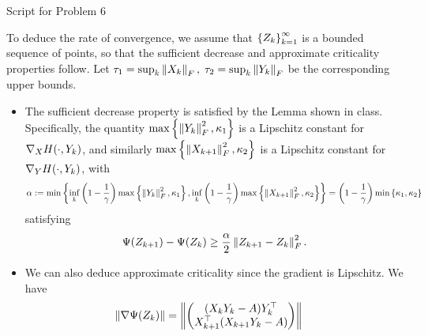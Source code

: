 \documentclass[10pt]{article}
\begin{document}
\begin{longlisting} \label{p6code}
	\inputminted{python}{hw2_p6.py}
	\caption{Script for Problem 6}
\end{longlisting}

To deduce the rate of convergence, we assume that $\left\{ Z_k \right\}_{k=1}^{\infty}$ is
a bounded sequence of points, so that the sufficient decrease and approximate
criticality properties follow. Let $\tau_1 = \sup_{k} \left \| X_k \right \|_F, \;
\tau_2 = \sup_{k} \left \| Y_k \right \|_F$ be the corresponding upper bounds.
\begin{itemize}
\item The sufficient decrease property is satisfied by the Lemma shown in class.
Specifically, the quantity $\max\left\{ \left \| Y_k \right \|_F^2, \kappa_1 \right\}$ is a
Lipschitz constant for $\nabla_X H(\cdot, Y_k)$, and similarly $
\max\left\{ \left \| X_{k+1} \right \|_F^2, \kappa_2 \right\}$ is a Lipschitz constant for $\nabla_Y
H(\cdot, Y_k)$, with
\[
    \alpha := \min\left\{ \inf_k \left(1 - \frac{1}{\gamma}\right)
        \max\left\{ \left \| Y_k \right \|_F^2, \kappa_1 \right\},
        \inf_k \left(1 - \frac{1}{\gamma}\right)
        \max\left\{ \left \| X_{k+1} \right \|_F^2, \kappa_2 \right\} \right\} =
   \left(1 - \frac{1}{\gamma}\right) \min \left\{ \kappa_1, \kappa_2 \right\}
\]
satisfying
\[
    \Psi(Z_{k+1}) - \Psi(Z_k) \geq \frac{\alpha}{2}
    \left \| Z_{k+1} - Z_k \right \|^2_F.
\]
\item We can also deduce approximate criticality since the gradient is
Lipschitz. We have
\begin{align*}
    \left \| \nabla \Psi(Z_k) \right \| &= \left \| \begin{pmatrix} 
        (X_k Y_k - A) Y_k^\top \\
        X_{k+1}^\top (X_{k+1} Y_k - A)
     \end{pmatrix} \right \|
\end{align*}
\end{itemize}
\end{document}

